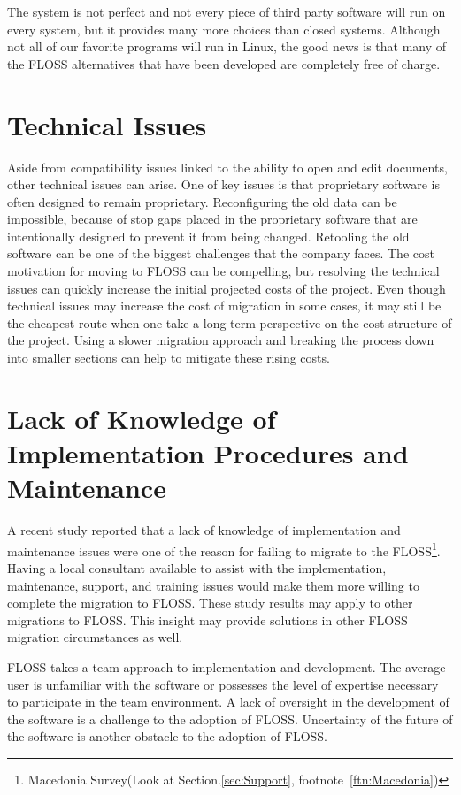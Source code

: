   The system is not perfect and not every piece of third party software will run on every system, but it provides many more choices than closed systems.
  Although not all of our favorite programs will run in Linux, the good news is that many of the FLOSS alternatives that have been developed are completely free of charge.


  \section{Technical Issues}
  Aside from compatibility issues linked to the ability to open and edit documents, other technical issues can arise. One of key issues is that proprietary software is often designed to remain proprietary. Reconfiguring the old data can be impossible, because of stop gaps placed in the proprietary software that are intentionally designed to prevent it from being changed. Retooling the old software can be one of the biggest challenges that the company faces. 
  The cost motivation for moving to FLOSS can be compelling, but resolving the technical issues can quickly increase the initial projected costs of the project. Even though technical issues may increase the cost of migration in some cases, it may still be the cheapest route when one take a long term perspective on the cost structure of the project. Using a slower migration approach and breaking the process down into smaller sections can help to mitigate these rising costs. 
	
  \section{Lack of Knowledge of Implementation Procedures and Maintenance}

  A recent study reported that a lack of knowledge of implementation and maintenance issues were one of the reason for failing to migrate to the FLOSS\footnote{Macedonia Survey(Look at Section.\ref{sec:Support}, footnote~\ref{ftn:Macedonia})}. 
  Having a local consultant available to assist with the implementation, maintenance, support, and training issues would make them more willing to complete the migration to FLOSS. These study results may apply to other migrations to FLOSS. This insight may provide solutions in other FLOSS migration circumstances as well.  

  FLOSS takes a team approach to implementation and development. The average user is unfamiliar with the software or possesses the level of expertise necessary to participate in the team environment.
  A lack of oversight in the development of the software is a challenge to the adoption of FLOSS. Uncertainty of the future of the software is another obstacle to the adoption of FLOSS. 

